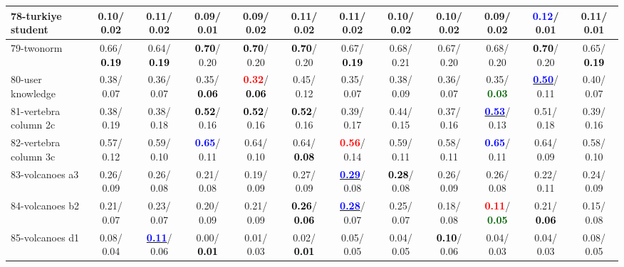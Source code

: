 \begin{table}[h]
\begin{center}
{\begin{tabular}{lc|c|c|c|c|c|c|c|c|c|c}
78-turkiye student &   0.10/  0.02 &   0.11/  0.02 &   0.09/  0.01 &   0.09/  0.02 &   0.11/  0.02 &   0.11/  0.02 &   0.10/  0.02 &   0.10/  0.02 &   0.09/  0.02 & \textcolor{blue}{\textbf{  0.12}}/  0.01 &   0.11/  0.01 \\ \hline
79-twonorm &   0.66/\textcolor{black}{\textbf{  0.19}} &   0.64/\textcolor{black}{\textbf{  0.19}} & \textcolor{black}{\textbf{  0.70}}/  0.20 & \textcolor{black}{\textbf{  0.70}}/  0.20 & \textcolor{black}{\textbf{  0.70}}/  0.20 &   0.67/\textcolor{black}{\textbf{  0.19}} &   0.68/  0.21 &   0.67/  0.20 &   0.68/  0.20 & \textcolor{black}{\textbf{  0.70}}/  0.20 &   0.65/\textcolor{black}{\textbf{  0.19}} \\
80-user knowledge &   0.38/  0.07 &   0.36/  0.07 &   0.35/\textcolor{black}{\textbf{  0.06}} & \textcolor{red}{\textbf{  0.32}}/\textcolor{black}{\textbf{  0.06}} &   0.45/  0.12 &   0.35/  0.07 &   0.38/  0.09 &   0.36/  0.07 &   0.35/\textcolor{darkgreen}{\textbf{  0.03}} & \underline{\textcolor{blue}{\textbf{  0.50}}}/  0.11 &   0.40/  0.07 \\
81-vertebra column 2c &   0.38/  0.19 &   0.38/  0.18 & \textcolor{black}{\textbf{  0.52}}/  0.16 & \textcolor{black}{\textbf{  0.52}}/  0.16 & \textcolor{black}{\textbf{  0.52}}/  0.16 &   0.39/  0.17 &   0.44/  0.15 &   0.37/  0.16 & \underline{\textcolor{blue}{\textbf{  0.53}}}/  0.13 &   0.51/  0.18 &   0.39/  0.16 \\
82-vertebra column 3c &   0.57/  0.12 &   0.59/  0.10 & \textcolor{blue}{\textbf{  0.65}}/  0.11 &   0.64/  0.10 &   0.64/\textcolor{black}{\textbf{  0.08}} & \textcolor{red}{\textbf{  0.56}}/  0.14 &   0.59/  0.11 &   0.58/  0.11 & \textcolor{blue}{\textbf{  0.65}}/  0.11 &   0.64/  0.09 &   0.58/  0.10 \\
83-volcanoes a3 &   0.26/  0.09 &   0.26/  0.08 &   0.21/  0.08 &   0.19/  0.09 &   0.27/  0.09 & \underline{\textcolor{blue}{\textbf{  0.29}}}/  0.08 & \textcolor{black}{\textbf{  0.28}}/  0.08 &   0.26/  0.09 &   0.26/  0.08 &   0.22/  0.11 &   0.24/  0.09 \\
84-volcanoes b2 &   0.21/  0.07 &   0.23/  0.07 &   0.20/  0.09 &   0.21/  0.09 & \textcolor{black}{\textbf{  0.26}}/\textcolor{black}{\textbf{  0.06}} & \underline{\textcolor{blue}{\textbf{  0.28}}}/  0.07 &   0.25/  0.07 &   0.18/  0.08 & \textcolor{red}{\textbf{  0.11}}/\textcolor{darkgreen}{\textbf{  0.05}} &   0.21/\textcolor{black}{\textbf{  0.06}} &   0.15/  0.08 \\
85-volcanoes d1 &   0.08/  0.04 & \underline{\textcolor{blue}{\textbf{  0.11}}}/  0.06 &   0.00/\textcolor{black}{\textbf{  0.01}} &   0.01/  0.03 &   0.02/\textcolor{black}{\textbf{  0.01}} &   0.05/  0.05 &   0.04/  0.05 & \textcolor{black}{\textbf{  0.10}}/  0.06 &   0.04/  0.03 &   0.04/  0.03 &   0.08/  0.05 \\ \hline

\end{tabular}}
\end{center}
\end{table}

